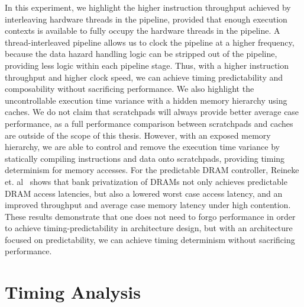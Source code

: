 In this experiment, we highlight the higher instruction throughput achieved by interleaving hardware threads in the pipeline, provided that enough execution contexts is available to fully occupy the hardware threads in the pipeline.  
A thread-interleaved pipeline allows us to clock the pipeline at a higher frequency, because the data hazard handling logic can be stripped out of the pipeline, providing less logic within each pipeline stage.
Thus, with a higher instruction throughput and higher clock speed, we can achieve timing predictability and composability without sacrificing performance. 
We also highlight the uncontrollable execution time variance with a hidden memory hierarchy using caches.
We do not claim that scratchpads will always provide better average case performance, as a full performance comparison between scratchpads and caches are outside of the scope of this thesis. 
However, with an exposed memory hierarchy, we are able to control and remove the execution time variance by statically compiling instructions and data onto scratchpads, providing timing determinism for memory accesses.
For the predictable DRAM controller, Reineke et. al~\cite{ReinekeLiuPatelKimLee11_PRETDRAMControllerBankPrivatizationForPredictability} shows that bank privatization of DRAMs not only achieves predictable DRAM access latencies, but also a lowered worst case access latency, and an improved throughput and average case memory latency under high contention. 
These results demonstrate that one does not need to forgo performance in order to achieve timing-predictability in architecture design, but with an architecture focused on predictability, we can achieve timing determinism without sacrificing performance.

\section{Timing Analysis}
\label{sec:wcet}

